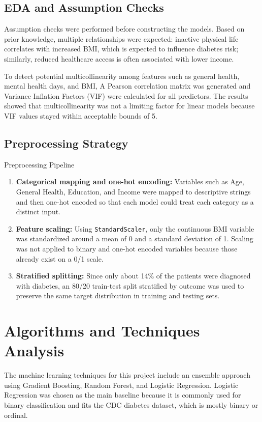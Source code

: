 \documentclass[11pt,letterpaper]{article}
\begin{document}
\subsection{EDA and Assumption Checks}
Assumption checks were performed before constructing the models. Based on prior knowledge, multiple relationships were expected: inactive physical life correlates with increased BMI, which is expected to influence diabetes risk; similarly, reduced healthcare access is often associated with lower income.

To detect potential multicollinearity among features such as general health, mental health days, and BMI, A Pearson correlation matrix was generated and Variance Inflation Factors (VIF) were calculated for all predictors. The results showed that multicollinearity was not a limiting factor for linear models because VIF values stayed within acceptable bounds of 5.

\subsection{Preprocessing Strategy}
\begin{methodbox}{Preprocessing Pipeline}
\begin{enumerate}[leftmargin=*, itemsep=0.35em]
  \item \textbf{Categorical mapping and one-hot encoding:} Variables such as Age, General Health, Education, and Income were mapped to descriptive strings and then one-hot encoded so that each model could treat each category as a distinct input.
  \item \textbf{Feature scaling:} Using \texttt{StandardScaler}, only the continuous BMI variable was standardized around a mean of 0 and a standard deviation of 1. Scaling was not applied to binary and one-hot encoded variables because those already exist on a 0/1 scale.
  \item \textbf{Stratified splitting:} Since only about 14\% of the patients were diagnosed with diabetes, an 80/20 train-test split stratified by outcome was used to preserve the same target distribution in training and testing sets.
\end{enumerate}
\end{methodbox}

\section{Algorithms and Techniques Analysis}
The machine learning techniques for this project include an ensemble approach using Gradient Boosting, Random Forest, and Logistic Regression. Logistic Regression was chosen as the main baseline because it is commonly used for binary classification and fits the CDC diabetes dataset, which is mostly binary or ordinal.
\end{document}
